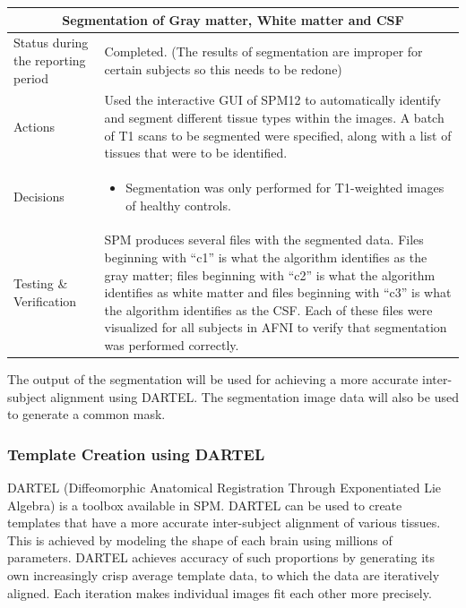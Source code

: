 \documentclass[12pt]{article}
\begin{document}
\begin{table}[H]
  \centering
  \begin{tabular} {| m{3.3cm} | m{11.5cm} | }
    \hline
    \multicolumn{2}{|c|}{Segmentation of Gray matter, White matter and
    CSF} \\ \hline
    Status during the reporting period   & Completed. (The results of
    segmentation are improper for certain subjects so this needs to be
    redone)   \\ \hline
    Actions &
    Used the interactive GUI of SPM12 to automatically identify and
    segment different tissue types within the images. A batch of
    T1 scans to be segmented were specified, along with a list of
    tissues that were to be identified.  \\ \hline

    Decisions &
    \begin{itemize}

      \item Segmentation was only performed for T1-weighted images of
        healthy controls.

    \end{itemize} \\ \hline

    Testing \& Verification &
    SPM produces several files with the segmented data. Files
    beginning with ``c1'' is what the algorithm identifies as the gray
    matter; files beginning with ``c2'' is what the algorithm
    identifies as white matter and files beginning with ``c3'' is what
    the algorithm identifies as the CSF. Each of these files were
    visualized for all subjects in AFNI to verify that segmentation
    was performed correctly. \\ \hline

  \end{tabular}
\end{table}

The output of the segmentation will be used for achieving a more
accurate inter-subject alignment using DARTEL. The segmentation image
data will also be used to generate a common mask.

\subsubsection{Template Creation using DARTEL}

DARTEL (Diffeomorphic Anatomical Registration Through Exponentiated
Lie Algebra) is a toolbox available in SPM. DARTEL can be used to
create templates that have a more accurate inter-subject alignment of
various tissues. This is achieved by modeling the shape of each brain
using millions of parameters. DARTEL achieves accuracy of such
proportions by generating its own increasingly crisp average template
data, to which the data are iteratively aligned. Each iteration makes
individual images fit each other more precisely.
\end{document}
